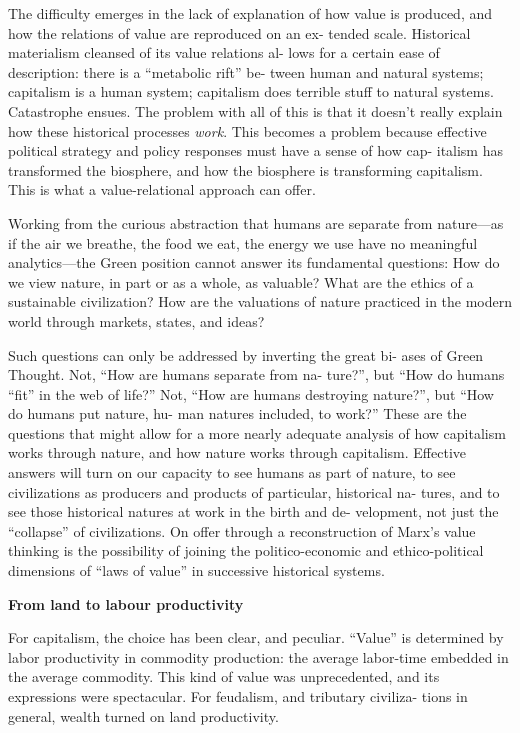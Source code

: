 \documentclass[
]{book}
\begin{document}
The difficulty emerges in the lack of explanation of how value is
produced, and how the relations of value are reproduced on an ex-
tended scale. Historical materialism cleansed of its value relations al-
lows for a certain ease of description: there is a ``metabolic rift'' be-
tween human and natural systems; capitalism is a human system;
capitalism does terrible stuff to natural systems. Catastrophe ensues.
The problem with all of this is that it doesn't really explain how these
historical processes \emph{work}. This becomes a problem because effective
political strategy and policy responses must have a sense of how cap-
italism has transformed the biosphere, and how the biosphere is
transforming capitalism. This is what a value-relational approach can
offer.

Working from the curious abstraction that humans are separate
from nature---as if the air we breathe, the food we eat, the energy we
use have no meaningful analytics---the Green position cannot answer
its fundamental questions: How do we view nature, in part or as a
whole, as valuable? What are the ethics of a sustainable civilization?
How are the valuations of nature practiced in the modern world
through markets, states, and ideas?

Such questions can only be addressed by inverting the great bi-
ases of Green Thought. Not, ``How are humans separate from na-
ture?'', but ``How do humans ``fit'' in the web of life?'' Not, ``How are
humans destroying nature?'', but ``How do humans put nature, hu-
man natures included, to work?'' These are the questions that might
allow for a more nearly adequate analysis of how capitalism works
through nature, and how nature works through capitalism. Effective
answers will turn on our capacity to see humans as part of nature, to
see civilizations as producers and products of particular, historical na-
tures, and to see those historical natures at work in the birth and de-
velopment, not just the ``collapse'' of civilizations. On offer through a
reconstruction of Marx's value thinking is the possibility of joining
the politico-economic and ethico-political dimensions of ``laws of
value'' in successive historical systems.

\textbf{From land to labour productivity}

For capitalism, the choice has
been clear, and peculiar. ``Value'' is determined by labor productivity
in commodity production: the average labor-time embedded in the
average commodity. This kind of value was unprecedented, and its
expressions were spectacular. For feudalism, and tributary civiliza-
tions in general, wealth turned on land productivity.
\end{document}
